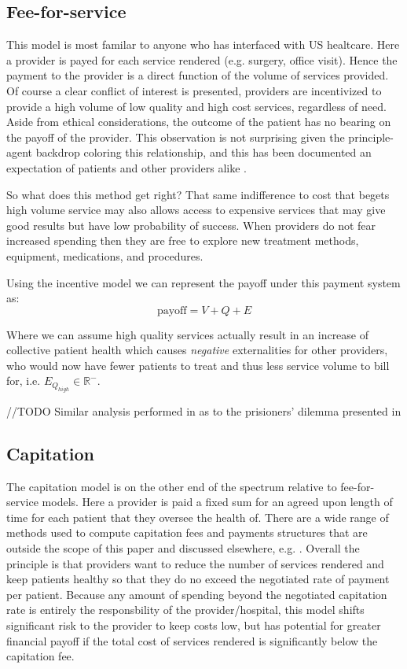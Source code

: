 \documentclass{article}
\begin{document}
\subsection{Fee-for-service}
This model is most familar to anyone who has interfaced with US healtcare. Here a provider is payed for each service rendered (e.g. surgery, office visit). Hence the payment to the provider is a direct function of the volume of services provided. Of course a clear conflict of interest is presented, providers are incentivized to provide a high volume of low quality and high cost services, regardless of need. Aside from ethical considerations, the outcome of the patient has no bearing on the payoff of the provider. This observation is not surprising given the principle-agent backdrop coloring this relationship, and this has been documented an expectation of patients and other providers alike \cite{econharvard}\cite{overtreat}.

So what does this method get right? That same indifference to cost that begets high volume service may also allows access to expensive services that may give good results but have low probability of success. When providers do not fear increased spending then they are free to explore new treatment methods, equipment, medications, and procedures.

Using the incentive model we can represent the payoff under this payment system as:
\begin{equation}
    \text{payoff} = V + Q + E
\end{equation}

Where we can assume high quality services actually result in an increase of collective patient health which causes \emph{negative} externalities for other providers, who would now have fewer patients to treat and thus less service volume to bill for, i.e. $E_{Q_{high}} \in \mathbb{R}^-$.

//TODO
Similar analysis performed in \cite{blended} as to the prisioners' dilemma presented in 

\subsection{Capitation} \label{sec:capitation}
The capitation model is on the other end of the spectrum relative to fee-for-service models. Here a provider is paid a fixed sum for an agreed upon length of time for each patient that they oversee the health of. There are a wide range of methods used to compute capitation fees and payments structures that are outside the scope of this paper and discussed elsewhere, e.g. \cite{capfees}. Overall the principle is that providers want to reduce the number of services rendered and keep patients healthy so that they do no exceed the negotiated rate of payment per patient. Because any amount of spending beyond the negotiated capitation rate is entirely the responsbility of the provider/hospital, this model shifts significant risk to the provider to keep costs low, but has potential for greater financial payoff if the total cost of services rendered is significantly below the capitation fee.
\end{document}
